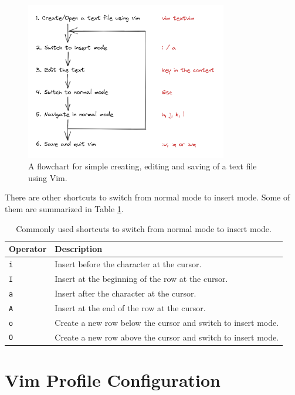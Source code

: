 \begin{figure}[htbp]
\centering
\includegraphics[width=250pt]{chapters/part-1/figures/vimbasicoperationflowchart.png}
\caption{A flowchart for simple creating, editing and saving of a text file using Vim.} \label{ch:tfe:fig:vimbasicoperationflowchart}
\end{figure}

There are other shortcuts to switch from normal mode to insert mode. Some of them are summarized in Table \ref{ch:tfe:tab:switchtoinsert}.

\begin{table}
  \centering \caption{Commonly used shortcuts to switch from normal mode to insert mode.}\label{ch:tfe:tab:switchtoinsert}
  \begin{tabularx}{\textwidth}{lX}
    \hline
    Operator & Description \\ \hline
    \verb|i| & Insert before the character at the cursor. \\ 
    \verb|I| & Insert at the beginning of the row at the cursor. \\ 
    \verb|a| & Insert after the character at the cursor. \\ 
    \verb|A| & Insert at the end of the row at the cursor. \\ 
    \verb|o| & Create a new row below the cursor and switch to insert mode. \\ 
    \verb|O| & Create a new row above the cursor and switch to insert mode. \\
    \hline
  \end{tabularx}
\end{table}

\section{Vim Profile Configuration}

